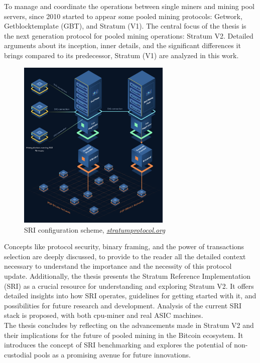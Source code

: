 To manage and coordinate the operations between single miners and mining pool servers, since 2010 started to appear some pooled mining protocols: Getwork, Getblocktemplate (GBT), and Stratum (V1).
The central focus of the thesis is the next generation protocol for pooled mining operations: Stratum V2. Detailed arguments about its inception, inner details, and the significant differences it brings compared to its predecessor, Stratum (V1) are analyzed in this work. \\
\begin{figure}
\centering
\includegraphics[width=0.65\textwidth]{Figures/sv2/sv2_9.png}
\caption{SRI configuration scheme, \href{http://stratumprotocol.org}{\textit{stratumprotocol.org}}}
\label{fig:sv2_conf}
\end{figure}
Concepts like protocol security, binary framing, and the power of transactions selection are deeply discussed, to provide to the reader all the detailed context necessary to understand the importance and the necessity of this protocol update. Additionally, the thesis presents the Stratum Reference Implementation (SRI) as a crucial resource for understanding and exploring Stratum V2. It offers detailed insights into how SRI operates, guidelines for getting started with it, and possibilities for future research and development.
Analysis of the current SRI stack is proposed, with both cpu-miner and real ASIC machines.\\
The thesis concludes by reflecting on the advancements made in Stratum V2 and their implications for the future of pooled mining in the Bitcoin ecosystem. It introduces the concept of SRI benchmarking and explores the potential of non-custodial pools as a promising avenue for future innovations.